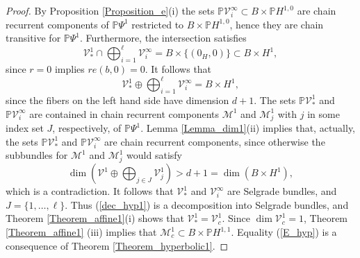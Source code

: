 \begin{proof}
		By Proposition \ref{Proposition_e}(i) the sets $\mathbb{P}\mathcal{V}%
		_{i}^{\infty}\subset B\times\mathbb{P}H^{1,0}$ are chain recurrent components
		of $\mathbb{P}\Psi^{1}$ restricted to $B\times\mathbb{P}H^{1,0}$, hence they
		are chain transitive for $\mathbb{P}\Psi^{1}$. Furthermore, the intersection
		satisfies%
		\[
		\mathcal{V}_{\ast}^{1}\cap\bigoplus\nolimits_{i=1}^{\ell}\mathcal{V}%
		_{i}^{\infty}=B\times\{\left(  0_{H},0\right)  \}\subset B\times H^{1},
		\]
		since $r=0$ implies $re(b,0)=0$. It follows that
		\begin{equation}
			\mathcal{V}_{\ast}^{1}\oplus\bigoplus\nolimits_{i=1}^{\ell}\mathcal{V}%
			_{i}^{\infty}=B\times H^{1}, \label{dec_hyp1}%
		\end{equation}
		since the fibers on the left hand side have dimension $d+1$. The sets
		$\mathbb{P}\mathcal{V}_{\ast}^{1}$ and $\mathbb{P}\mathcal{V}_{i}^{\infty}$
		are contained in chain recurrent components $\mathcal{M}^{1}$ and
		$\mathcal{M}_{j}^{1}$ with $j$ in some index set $J$, respectively, of
		$\mathbb{P}\Psi^{1}$. Lemma \ref{Lemma_dim1}(ii) implies that, actually, the
		sets $\mathbb{P}\mathcal{V}_{\ast}^{1}$ and $\mathbb{P}\mathcal{V}_{i}%
		^{\infty}$ are chain recurrent components, since otherwise the subbundles for
		$\mathcal{M}^{1}$ and $\mathcal{M}_{j}^{1}$ would satisfy
		\[
		\dim\left(  \mathcal{V}^{1}\oplus\bigoplus\nolimits_{j\in J}\mathcal{V}%
		_{j}^{1}\right)  >d+1=\dim(B\times H^{1}),
		\]
		which is a contradiction. It follows that $\mathcal{V}_{\ast}^{1}$ and
		$\mathcal{V}_{i}^{\infty}$ are Selgrade bundles, and $J=\{1,\ldots,\ell\}$.
		Thus (\ref{dec_hyp1}) is a decomposition into Selgrade bundles, and Theorem
		\ref{Theorem_affine1}(i) shows that $\mathcal{V}_{\ast}^{1}=\mathcal{V}%
		_{c}^{1}$. Since $\dim\mathcal{V}_{c}^{1}=1$, Theorem \ref{Theorem_affine1}%
		(iii) implies that $\mathcal{M}_{c}^{1}\subset B\times\mathbb{P}H^{1,1}$.
		Equality (\ref{E_hyp}) is a consequence of Theorem \ref{Theorem_hyperbolic1}.
		

\end{proof}
